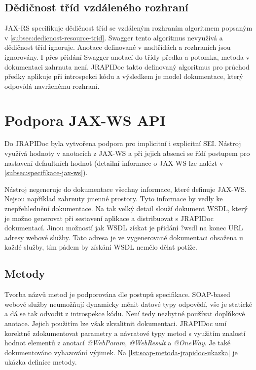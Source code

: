 \documentclass[11pt,twoside,a4paper]{book}
\begin{document}
\subsection{Dědičnost tříd vzdáleného rozhraní}

JAX-RS specifikuje dědičnost tříd se vzdáleným rozhraním algoritmem popsaným v
\ref{subsec:dedicnost-resource-trid}. Swagger tento algoritmus nevyužívá a
dědičnost tříd ignoruje. Anotace definované v nadtřídách a rozhraních jsou ignorovány. I přes
přidání Swagger anotací do třídy předka a potomka, metoda v dokumentaci zahrnuta
není. JRAPIDoc takto definovaný algoritmus pro průchod předky aplikuje při
introspekci kódu a výsledkem je model dokumentace, který odpovídá navrženému
rozhraní.

\section{Podpora JAX-WS API}

Do JRAPIDoc byla vytvořena podpora pro implicitní i explicitní SEI. Nástroj
využívá hodnoty v anotacích z JAX-WS a při jejich absenci se řídí postupem pro
nastavení defaultních hodnot (detailní informace o JAX-WS lze nalézt v
\ref{subsec:specifikace-jax-ws}).

Nástroj negeneruje do dokumentace všechny informace, které definuje JAX-WS.
Nejsou například zahrnuty jmenné prostory.
Tyto informace by vedly ke znepřehlednění dokumentace. Na tak velký detail
slouží dokument WSDL, který je možno generovat při sestavení aplikace a
distribuovat s JRAPIDoc dokumentací. Jinou možností jak WSDL získat je přidání
?wsdl na konec URL adresy webové služby.
Tato adresa je ve vygenerované dokumentaci obsažena u každé služby, tím pádem by
získání WSDL nemělo dělat potíže.

\subsection{Metody}

Tvorba názvů metod je podporována dle postupů specifikace. SOAP-based webové
služby neumožňují dynamicky měnit datové typy odpovědí, vše je statické a dá se
tak odvodit z introspekce kódu. Není tedy nezbytné používat doplňkové anotace.
Jejich použitím lze však zkvalitnit dokumentaci. JRAPIDoc umí korektně
zdokumentovat parametry a návratové typy metod s využitím znalostí hodnot
elementů z anotací {\em @WebParam}, {\em @WebResult} a {\em @OneWay}. Je také
dokumentováno vyhazování výjimek.
Na \ref{lst:soap-metoda-jrapidoc-ukazka} je ukázka definice metody.
\end{document}
